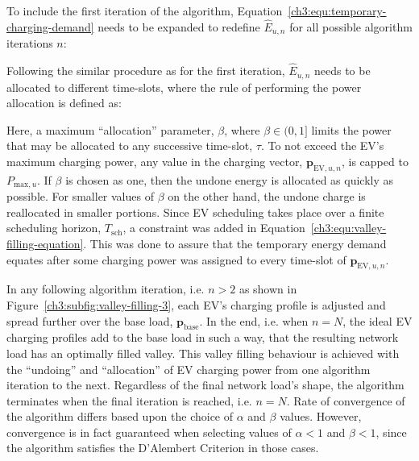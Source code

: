 To include the first iteration of the algorithm, Equation~\ref{ch3:equ:temporary-charging-demand} needs to be expanded to redefine $\hat{E}_{u,n}$ for all possible algorithm iterations $n$:



Following the similar procedure as for the first iteration, $\hat{E}_{u,n}$ needs to be allocated to different time-slots, where the rule of performing the power allocation is defined as:



\nomenclature[K]{$\beta$}{Allocation parameter to assign a portion of the temporary energy demand, $\hat{E}_{u,n}$, where $\beta \in (0, 1]$}

Here, a maximum ``allocation'' parameter, $\beta$, where $\beta \in (0, 1]$ limits the power that may be allocated to any successive time-slot, $\tau$.
To not exceed the EV's maximum charging power, any value in the charging vector, $\textbf{p}_{\text{EV},u,n}$, is capped to $P_{\text{max},u}$.
If $\beta$ is chosen as one, then the undone energy is allocated as quickly as possible.
For smaller values of $\beta$ on the other hand, the undone charge is reallocated in smaller portions.
Since EV scheduling takes place over a finite scheduling horizon, $T_\text{sch}$, a constraint was added in Equation~\ref{ch3:equ:valley-filling-equation}.
This was done to assure that the temporary energy demand equates after some charging power was assigned to every time-slot of $\textbf{p}_{\text{EV},u,n}$.

In any following algorithm iteration, i.e. $n>2$ as shown in Figure~\ref{ch3:subfig:valley-filling-3}, each EV's charging profile is adjusted and spread further over the base load, $\textbf{p}_\text{base}$.
In the end, i.e. when $n=N$, the ideal EV charging profiles add to the base load in such a way, that the resulting network load has an optimally filled valley.
This valley filling behaviour is achieved with the ``undoing'' and ``allocation'' of EV charging power from one algorithm iteration to the next.
Regardless of the final network load's shape, the algorithm terminates when the final iteration is reached, i.e. $n=N$.
Rate of convergence of the algorithm differs based upon the choice of $\alpha$ and $\beta$ values.
However, convergence is in fact guaranteed when selecting values of $\alpha < 1$ and $\beta < 1$, since the algorithm satisfies the D'Alembert Criterion in those cases.

